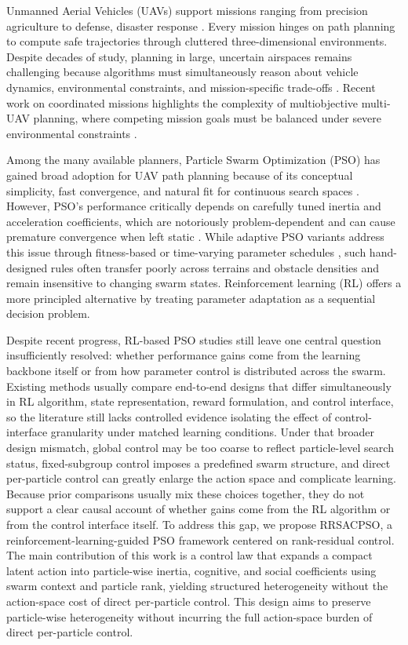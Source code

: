 \documentclass[final,5p,times]{elsarticle}
\begin{document}
\label{sec:intro}
Unmanned Aerial Vehicles (UAVs) support missions ranging from precision agriculture to defense, disaster response \cite{Delavarpour2021A, Fascista2022Toward, Alotaibi2019LSAR}.
Every mission hinges on path planning to compute safe trajectories through cluttered three-dimensional environments.
Despite decades of study, planning in large, uncertain airspaces remains challenging because algorithms must simultaneously reason about vehicle dynamics, environmental constraints, and mission-specific trade-offs \cite{AitSaadi2022UAV, Zhou2025A}.
Recent work on coordinated missions highlights the complexity of multiobjective multi-UAV planning, where competing mission goals must be balanced under severe environmental constraints \cite{Meng2025Multiobjective}.

Among the many available planners, Particle Swarm Optimization (PSO) \cite{Kennedy1995Particle} has gained broad adoption for UAV path planning because of its conceptual simplicity, fast convergence, and natural fit for continuous search spaces \cite{Cheng2024Research}.
However, PSO's performance critically depends on carefully tuned inertia and acceleration coefficients, which are notoriously problem-dependent and can cause premature convergence when left static \cite{Yang2015Lowdiscrepancy}.
While adaptive PSO variants address this issue through fitness-based or time-varying parameter schedules \cite{Bansal2011Inertia, Liu2025A}, such hand-designed rules often transfer poorly across terrains and obstacle densities and remain insensitive to changing swarm states.
Reinforcement learning (RL) offers a more principled alternative by treating parameter adaptation as a sequential decision problem.

Despite recent progress, RL-based PSO studies still leave one central question insufficiently resolved: whether performance gains come from the learning backbone itself or from how parameter control is distributed across the swarm.
Existing methods usually compare end-to-end designs that differ simultaneously in RL algorithm, state representation, reward formulation, and control interface, so the literature still lacks controlled evidence isolating the effect of control-interface granularity under matched learning conditions.
Under that broader design mismatch, global control may be too coarse to reflect particle-level search status, fixed-subgroup control imposes a predefined swarm structure, and direct per-particle control can greatly enlarge the action space and complicate learning.
Because prior comparisons usually mix these choices together, they do not support a clear causal account of whether gains come from the RL algorithm or from the control interface itself.
To address this gap, we propose RRSACPSO, a reinforcement-learning-guided PSO framework centered on rank-residual control.
The main contribution of this work is a control law that expands a compact latent action into particle-wise inertia, cognitive, and social coefficients using swarm context and particle rank, yielding structured heterogeneity without the action-space cost of direct per-particle control.
This design aims to preserve particle-wise heterogeneity without incurring the full action-space burden of direct per-particle control.
\end{document}
